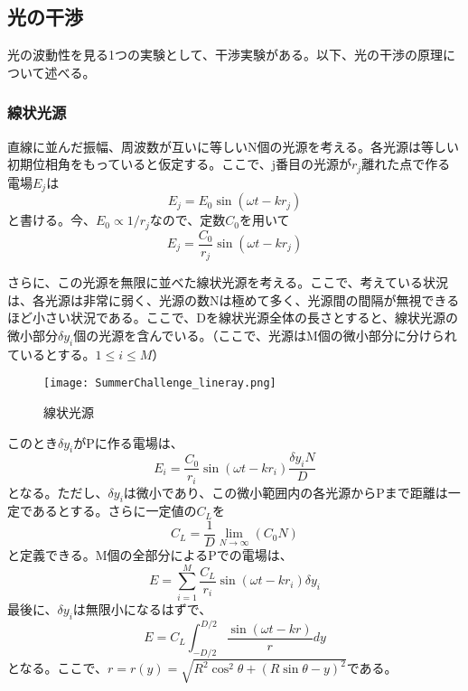 \documentclass[10pt,a4j]{jarticle}
\begin{document}
\subsection{光の干渉}
光の波動性を見る1つの実験として、干渉実験がある。以下、光の干渉の原理について述べる。
\subsubsection{線状光源}
直線に並んだ振幅、周波数が互いに等しいN個の光源を考える。各光源は等しい初期位相角をもっていると仮定する。ここで、j番目の光源が$r_j$離れた点で作る電場$E_j$は
\[
E_j = E_0 \sin(\omega t - k r_j)
\]
と書ける。今、$E_0 \varpropto 1/{r_j}$なので、定数$C_0$を用いて
\[
E_j = \frac{C_0}{r_j} \sin(\omega t - k r_j)
\]



さらに、この光源を無限に並べた線状光源を考える。ここで、考えている状況は、各光源は非常に弱く、光源の数Nは極めて多く、光源間の間隔が無視できるほど小さい状況である。ここで、Dを線状光源全体の長さとすると、線状光源の微小部分$\delta y_i$個の光源を含んでいる。（ここで、光源はM個の微小部分に分けられているとする。$1 \leq i \leq M$）
\\
\begin{figure}[b]
\begin{center}
\texttt{[image: SummerChallenge\_lineray.png]}
\caption{線状光源}
\end{center}
\end{figure}

\clearpage
このとき$\delta y_i$がPに作る電場は、
\[
E_i = \frac{C_0}{r_i} \sin(\omega t- k r_i ) \frac{\delta y_i N}{D}
\]
となる。ただし、$\delta y_i$は微小であり、この微小範囲内の各光源からPまで距離は一定であるとする。さらに一定値の$C_L$を
\[
C_L = \frac{1}{D}  \lim_{N \to \infty} (C_0 N)
\]
と定義できる。M個の全部分によるPでの電場は、
\[
E = \sum_{i=1}^M \frac{C_L}{r_i} \sin(\omega t - k r_i) \delta y_i
\]
最後に、$\delta y_i$は無限小になるはずで、
\[
E = C_L \int_{-D/2}^{D/2} \frac{\sin(\omega t - k r)}{r} dy
\]
となる。ここで、$r = r(y)=\sqrt{R^2 \cos^2 \theta + (R\sin \theta - y )^2}$である。
\end{document}
